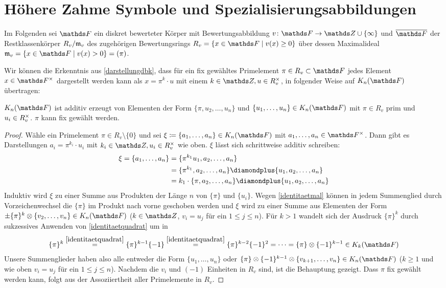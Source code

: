 \documentclass[ngerman,fontsize=11pt, paper=a4, parskip=half, titlepage=true, toc=bib]{scrartcl}
\begin{document}
\section{Höhere Zahme Symbole und Spezialisierungsabbildungen}
Im Folgenden sei $\F$ ein diskret bewerteter Körper mit
Bewertungsabbildung $v\colon \F\to\Z\cup\{\infty\}$ und
$\overline{\F}$ der Restklassenkörper $R_v/\mathfrak{m}_v$ 
des zugehörigen Bewertungsrings $R_v=\left\{x\in\F\mid v(x)\geq0\right\}$
über dessen Maximalideal $\frakm_v=\left\{x\in\F\mid v(x)>0\right\}=(\pi)$.

Wir können die Erkenntnis aus \ref{darstellungdbk},
dass für ein fix gewähltes Primelement $\pi\in R_v\subset \F$
jedes Element $x\in\Fx$ dargestellt werden kann als 
$x=\pi^k\cdot u$ mit einem $k\in\Z, u\in \Rx_v$,
in folgender Weise auf $\KnF$ übertragen:

\begin{Lem}\label{darstellungknf}
  $\KnF$ ist additiv erzeugt von Elementen der Form 
  $\{\pi, u_{2},\dotsc,u_n\}$
  und $\{u_{1},\dotsc,u_n\}\in\KnF$ mit $\pi\in R_v$ prim und
  $u_i\in R^\times_v$.
  $\pi$ kann fix gewählt werden.
  \begin{proof}
    Wähle ein Primelement $\pi\in R_v\setminus\{0\}$
    und sei $\xi\coloneqq\{a_1,\dotsc, a_n\}\in\KnF$ mit
    $a_1,\dotsc,a_n\in\Fx$. Dann gibt es Darstellungen
    $a_i=\pi^{k_i}\cdot u_i$ mit $k_i\in\Z,u_i\in \Rx_v$ wie
    oben. $\xi$ lässt sich schrittweise additiv schreiben:
    \begin{align*}
      \xi=\{a_1,\dotsc,a_n\}
      &=\{\pi^{k_1}u_1, a_2, \dotsc, a_n\}\\
      &=\{\pi^{k_1}, a_2, \dotsc, a_n\}
        \p\{u_1, a_2, \dotsc, a_n\}\\
      &=k_1\cdot \{\pi,a_2, \dotsc, a_n\}
        \p\{u_1, a_2, \dotsc, a_n\}
    \end{align*}
    Induktiv wird $\xi$ zu einer Summe aus Produkten der Länge $n$ von
    $\{\pi\}$ und $\{u_i\}$.
    Wegen \ref{identitaetmal} können in jedem Summenglied durch
    Vorzeichenwechsel die $\{\pi\}$ im Produkt nach vorne geschoben werden
    und $\xi$ wird zu einer Summe aus Elementen der Form
    $\pm\{\pi\}^k\otimes\{v_{2},\dotsc,v_n\}\in\KnF$ 
    ($k\in\Z$, $v_i=u_j$ für ein $1\leq j\leq n$).
    Für $k>1$ wandelt sich der Ausdruck $\{\pi\}^k$ durch
    sukzessives Anwenden von \ref{identitaetquadrat} um in
    \begin{gather*}
      \{\pi\}^k
      \overset{\ref{identitaetquadrat}}{=} \{\pi\}^{k-1}\{-1\}
      \overset{\ref{identitaetquadrat}}{=} \{\pi\}^{k-2}\{-1\}^2
      =\dotsb=\{\pi\}\otimes\{-1\}^{k-1} \in\K_{k}(\F)
    \end{gather*}
    Unsere Summenglieder haben also alle entweder die Form 
    $\{u_1,\dotsc, u_n\}$ oder
    $\{\pi\}\otimes\{-1\}^{k-1}\otimes\{v_{k+1},\dotsc,v_n\}\in\KnF$
    ($k\geq 1$ und wie oben $v_i=u_j$ für ein $1\leq j\leq n$).
    Nachdem die $v_i$ und $(-1)$ Einheiten in $R_v$ sind,
    ist die Behauptung gezeigt.
    Dass $\pi$ fix gewählt werden kann, folgt aus der Assoziiertheit
    aller Primelemente in $R_v$.
  \end{proof}
\end{Lem}
\end{document}
